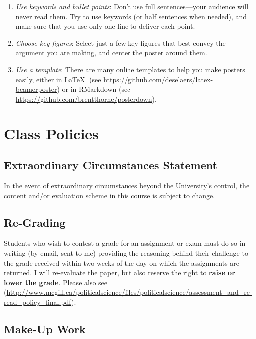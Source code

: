 \documentclass[11pt]{article}
\begin{document}
\begin{enumerate}
\def\labelenumi{\arabic{enumi}.}
\item \emph{Use keywords and bullet points}:  Don't use full sentences—your audience will never read them. Try to use keywords (or half sentences when needed), and make sure that you use only one line to deliver each point.
\item \emph{Choose key figures}: Select just a few key figures that best convey the argument you are making, and center the poster around them.
\item \emph{Use a template}: There are many online templates to help you make posters easily, either in \LaTeX $\;$ (see \url{https://github.com/deselaers/latex-beamerposter}) or in RMarkdown (see \url{https://github.com/brentthorne/posterdown}).

\end{enumerate}


\section{Class Policies}
\subsection*{Extraordinary Circumstances Statement}

In the event of extraordinary circumstances beyond the University’s control, the content and/or evaluation scheme in this course is subject to change.

\subsection*{Re-Grading}

Students who wish to contest a grade for an assignment or exam must do
so in writing (by email, sent to me) providing the reasoning behind
their challenge to the grade received within two weeks of the day on
which the assignments are returned. I will re-evaluate the paper, but
also reserve the right to \textbf{raise or lower the grade}. Please also
see
(\url{http://www.mcgill.ca/politicalscience/files/politicalscience/assessment_and_re-read_policy_final.pdf}).

\subsection*{Make-Up Work}
\end{document}

